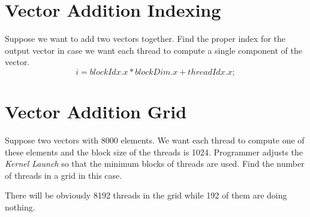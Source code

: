 \documentclass[12pt]{article}
\numberwithin{equation}{section}
\numberwithin{table}{section}
\numberwithin{figure}{section}
\begin{document}
\section{Vector Addition Indexing}
Suppose we want to add two vectors together. Find the proper index for the output vector in case we want each thread to compute a single component of the vector.
$$
	i = blockIdx.x*blockDim.x + threadIdx.x; 
$$

\section{Vector Addition Grid}
Suppose two vectors with 8000 elements. We want each thread to compute one of these elements and the block size of the threads is 1024. Programmer adjusts the \textit{Kernel Launch} so that the minimum blocks of threads are used. Find the number of threads in a grid in this case. 

There will be obviously 8192 threads in the grid while 192 of them are doing nothing.
\end{document}
